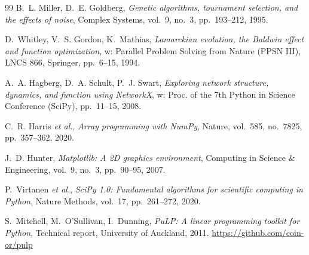 \documentclass[12pt,a4paper]{article}
\begin{document}
\begin{thebibliography}{99}
B.~L. Miller, D.~E. Goldberg,
\textit{Genetic algorithms, tournament selection, and the effects of noise},
Complex Systems, vol.~9, no.~3, pp.~193--212, 1995.

D.~Whitley, V.~S. Gordon, K.~Mathias,
\textit{Lamarckian evolution, the Baldwin effect and function optimization},
w: Parallel Problem Solving from Nature (PPSN III), LNCS 866, Springer, pp.~6--15, 1994.

A.~A. Hagberg, D.~A. Schult, P.~J. Swart,
\textit{Exploring network structure, dynamics, and function using NetworkX},
w: Proc. of the 7th Python in Science Conference (SciPy), pp.~11--15, 2008.

C.~R. Harris \textit{et al.},
\textit{Array programming with NumPy},
Nature, vol.~585, no.~7825, pp.~357--362, 2020.

J.~D. Hunter,
\textit{Matplotlib: A 2D graphics environment},
Computing in Science \& Engineering, vol.~9, no.~3, pp.~90--95, 2007.

P.~Virtanen \textit{et al.},
\textit{SciPy 1.0: Fundamental algorithms for scientific computing in Python},
Nature Methods, vol.~17, pp.~261--272, 2020.

S.~Mitchell, M.~O'Sullivan, I.~Dunning,
\textit{PuLP: A linear programming toolkit for Python},
Technical report, University of Auckland, 2011.
\url{https://github.com/coin-or/pulp}

\end{thebibliography}
\end{document}
